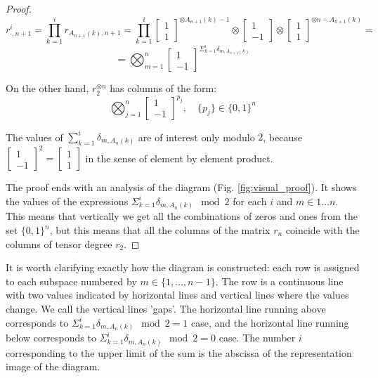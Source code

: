 \documentclass[a4paper, openany, 12pt]{article}
\theoremstyle{remark}
\theoremstyle{definition}
\newcommand{\ot}{\otimes}
\begin{document}
\begin{proof}
\begin{equation}     r^i_{\cdot,n+1} = \prod_{k=1}^i r_{A_{n+1}(k),n+1} = \prod_{k=1}^i \begin{bmatrix}1\\1\end{bmatrix}^{\ot A_{n+1}(k)-1}\ot\begin{bmatrix}1\\-1\end{bmatrix}\ot\begin{bmatrix}1\\1\end{bmatrix}^{\ot n-A_{n+1}(k)} = \end{equation}
\begin{equation}     = \bigotimes_{m=1}^n\begin{bmatrix}1\\-1\end{bmatrix}^{\Sigma_{k=1}^i\delta_{m,A_{n+1}(k)}}
\label{eq:general_from_core}\end{equation}

On the other hand, $r_2^{\ot n}$ has columns of the form:\begin{equation}     \bigotimes_{j=1}^n\begin{bmatrix}1\\-1\end{bmatrix}^{p_j},\quad \{p_j\}\in\{0,1\}^n \end{equation}

The values of $\sum_{k=1}^i\delta_{m,A_{n}(k)}$ are of interest only modulo $2$, because $\begin{bmatrix}1\\-1\end{bmatrix}^{2} = \begin{bmatrix}1\\1\end{bmatrix}$ in the sense of element by element product.

The proof ends with an analysis of the diagram (Fig. \ref{fig:visual_proof}). It shows the values of the expressions $\Sigma_{k=1}^i\delta_{m,A_{n}(k)}\mod 2$ for each $i$ and $m\in {1\dots n}$. This means that vertically we get all the combinations of zeros and ones from the set $\{0,1\}^n$, but this means that all the columns of the matrix $r_n$ coincide with the columns of tensor degree $r_2$.
\end{proof}

It is worth clarifying exactly how the diagram is constructed: each row is assigned to each subspace numbered by $m\in\{1,\dots,n-1\}$. The row is a continuous line with two values indicated by horizontal lines and vertical lines where the values change. We call the vertical lines 'gaps'. The horizontal line running above corresponds to  $\Sigma_{k=1}^i\delta_{m,A_{n}(k)}\mod 2 = 1$ case, and the horizontal line running below corresponds to $\Sigma_{k=1}^i\delta_{m,A_{n}(k)}\mod 2 = 0$ case. The number $i$ corresponding to the upper limit of the sum is the abscissa of the representation image of the diagram.
\end{document}
